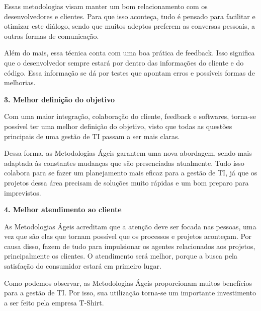 Essas metodologias visam manter um bom relacionamento com os desenvolvedores e clientes. Para que isso aconteça, tudo é pensado para facilitar e otimizar este diálogo, sendo que muitos adeptos preferem as conversas pessoais, a outras formas de comunicação.

Além do mais, essa técnica conta com uma boa prática de feedback. Isso significa que o desenvolvedor sempre estará por dentro das informações do cliente e do código. Essa informação se dá por testes que apontam erros e possíveis formas de melhorias.

\textbf{3. Melhor definição do objetivo}

Com uma maior integração, colaboração do cliente, feedback e softwares, torna-se possível ter uma melhor definição do objetivo, visto que todas as questões principais de uma gestão de TI passam a ser mais claras.

Dessa forma, as Metodologias Ágeis garantem uma nova abordagem, sendo mais adaptada às constantes mudanças que são presenciadas atualmente. Tudo isso colabora para se fazer um planejamento mais eficaz para a gestão de TI, já que os projetos dessa área precisam de soluções muito rápidas e um bom preparo para imprevistos.

\textbf{4. Melhor atendimento ao cliente}

As Metodologias Ágeis acreditam que a atenção deve ser focada nas pessoas, uma vez que são elas que tornam possível que os processos e projetos aconteçam. Por causa disso, fazem de tudo para impulsionar os agentes relacionados aos projetos, principalmente os clientes. O atendimento será melhor, porque a busca pela satisfação do consumidor estará em primeiro lugar.

Como podemos observar, as Metodologias Ágeis proporcionam muitos benefícios para a gestão de TI. Por isso, sua utilização torna-se um importante investimento a ser feito pela empresa T-Shirt.